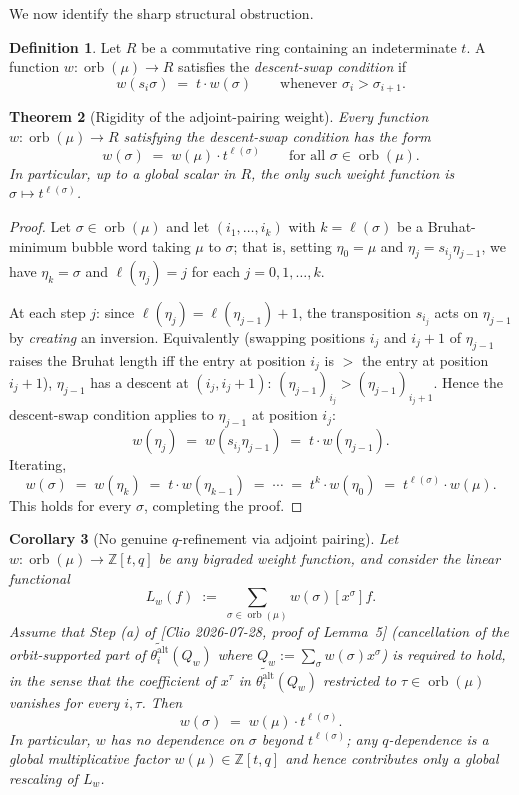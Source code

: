 \documentclass[11pt]{article}
\newtheorem{theorem}{Theorem}
\newtheorem{corollary}[theorem]{Corollary}
\theoremstyle{definition}
\newtheorem{definition}[theorem]{Definition}
\theoremstyle{remark}
\newcommand{\orb}{\operatorname{orb}}
\newcommand{\thetaalt}{\theta^{\mathrm{alt}}}
\begin{document}
We now identify the sharp structural obstruction.

\begin{definition}\label{def:ds}
Let $R$ be a commutative ring containing an indeterminate $t$. A function
$w: \orb(\mu) \to R$ satisfies the \emph{descent-swap condition} if
\[
  w(s_i \sigma) \;=\; t \cdot w(\sigma)
  \qquad\text{whenever } \sigma_i > \sigma_{i+1}.
\]
\end{definition}

\begin{theorem}[Rigidity of the adjoint-pairing weight]\label{thm:rigidity}
Every function $w: \orb(\mu) \to R$ satisfying the descent-swap condition
has the form
\[
  w(\sigma) \;=\; w(\mu) \cdot t^{\ell(\sigma)}
  \qquad \text{for all } \sigma \in \orb(\mu).
\]
In particular, up to a global scalar in $R$, the only such weight function
is $\sigma \mapsto t^{\ell(\sigma)}$.
\end{theorem}

\begin{proof}
Let $\sigma \in \orb(\mu)$ and let $(i_1, \ldots, i_k)$ with $k = \ell(\sigma)$
be a Bruhat-minimum bubble word taking $\mu$ to $\sigma$; that is, setting
$\eta_0 = \mu$ and $\eta_j = s_{i_j} \eta_{j-1}$, we have $\eta_k = \sigma$
and $\ell(\eta_j) = j$ for each $j = 0, 1, \ldots, k$.

At each step $j$: since $\ell(\eta_j) = \ell(\eta_{j-1}) + 1$, the transposition
$s_{i_j}$ acts on $\eta_{j-1}$ by \emph{creating} an inversion. Equivalently
(swapping positions $i_j$ and $i_j+1$ of $\eta_{j-1}$ raises the Bruhat length
iff the entry at position $i_j$ is $>$ the entry at position $i_j+1$),
$\eta_{j-1}$ has a descent at $(i_j, i_j+1)$: $(\eta_{j-1})_{i_j} > (\eta_{j-1})_{i_j+1}$.
Hence the descent-swap condition applies to $\eta_{j-1}$ at position $i_j$:
\[
  w(\eta_j) \;=\; w(s_{i_j} \eta_{j-1}) \;=\; t \cdot w(\eta_{j-1}).
\]
Iterating,
\[
  w(\sigma) \;=\; w(\eta_k) \;=\; t \cdot w(\eta_{k-1}) \;=\; \cdots
                 \;=\; t^k \cdot w(\eta_0) \;=\; t^{\ell(\sigma)} \cdot w(\mu).
\]
This holds for every $\sigma$, completing the proof.
\end{proof}

\begin{corollary}[No genuine $q$-refinement via adjoint pairing]\label{cor:no-q}
Let $w: \orb(\mu) \to \mathbb Z[t,q]$ be any bigraded weight function, and
consider the linear functional
\[
   L_w(f) \;:=\; \sum_{\sigma \in \orb(\mu)} w(\sigma) [x^\sigma] f.
\]
Assume that Step (a) of [Clio 2026-07-28, proof of Lemma~5] (cancellation of
the orbit-supported part of $\widetilde{\thetaalt_i}(Q_w)$ where
$Q_w := \sum_\sigma w(\sigma) x^\sigma$) is required to hold, in the sense
that the coefficient of $x^\tau$ in $\widetilde{\thetaalt_i}(Q_w)$
restricted to $\tau \in \orb(\mu)$ vanishes for every $i, \tau$. Then
\[
   w(\sigma) \;=\; w(\mu) \cdot t^{\ell(\sigma)}.
\]
In particular, $w$ has no dependence on $\sigma$ beyond $t^{\ell(\sigma)}$;
any $q$-dependence is a global multiplicative factor $w(\mu) \in \mathbb Z[t,q]$
and hence contributes only a global rescaling of $L_w$.
\end{corollary}
\end{document}
